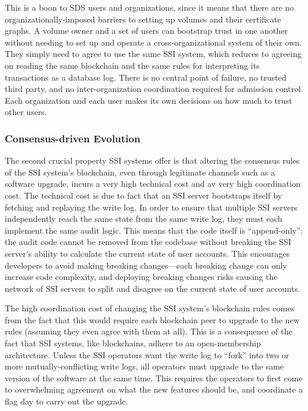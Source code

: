 This is a boon to SDS users and organizations, since it means
that there are no organizationally-imposed barriers to setting up volumes and
their certificate graphs.  A volume owner and a set of users can bootstrap trust
in one another without needing to set up and operate a cross-organizational
system of their own.  They simply need to agree to use the same SSI system,
which reduces to agreeing on reading the same blockchain and the same rules for
interpreting its transactions as a database log.  There is no central point of
failure, no trusted third party, and no inter-organization coordination required
for admission control.  Each organization and each user makes its own decisions
on how much to trust other users.

\subsubsection{Consensus-driven Evolution}

The second crucial property SSI systems offer
is that altering the consensus rules of the SSI system's
blockchain, even through legitimate channels such as a 
software upgrade, incurs a very high technical cost and av very high coordination cost.
The technical cost is due to fact that an SSI server
bootstraps itself by fetching and replaying the write log.  In order to
ensure that multiple SSI servers independently reach the same state from the
same write log, they must each implement the same audit logic.  This means that
the code itself is ``append-only'':  the audit code cannot be removed from
the codebase without breaking the SSI server's ability to calculate the current
state of user accounts.  This encourages developers to avoid making breaking
changes---each breaking change can only increase code complexity,
and deploying breaking changes risks causing the network of SSI servers to split
and disagree on the current state of user accounts.

The high coordination cost of changing the SSI system's blockchain rules
comes from the fact that this would require each blockchain peer to upgrade
to the new rules (assuming they even agree with them at all).  This is a
consequence of the fact that SSI systems, like blockchains, adhere to an
open-membership architecture.  Unless the SSI
operators want the write log to ``fork'' into two or more mutually-conflicting
write logs, all operators must upgrade to the same version of the software
at the same time.  This requires the operators to first come to overwhelming
agreement on what the new features should be, and coordinate a flag day
to carry out the upgrade.

